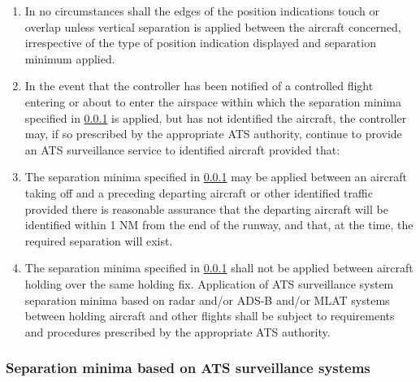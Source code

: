\begin{enumerate}
    \item In no circumstances shall the edges of the position indications touch or overlap unless vertical separation is applied between the aircraft concerned, irrespective of the type of position indication displayed and separation minimum applied.
    \item \label{8.7.2.8} In the event that the controller has been notified of a controlled flight entering or about to enter the airspace within which the separation minima specified in \ref{8.7.3} is applied, but has not identified the aircraft, the controller may, if so prescribed by the appropriate ATS authority, continue to provide an ATS surveillance service to identified aircraft provided that:
    

    \item \label{8.7.2.9} The separation minima specified in \ref{8.7.3} may be applied between an aircraft taking off and a preceding departing aircraft or other identified traffic provided there is reasonable assurance that the departing aircraft will be identified within 1 NM from the end of the runway, and that, at the time, the required separation will exist.
    \item The separation minima specified in \ref{8.7.3} shall not be applied between aircraft holding over the same holding fix. Application of ATS surveillance system separation minima based on radar and/or ADS-B and/or MLAT systems between holding aircraft and other flights shall be subject to requirements and procedures prescribed by the appropriate ATS authority.
\end{enumerate}

\subsubsection{Separation minima based on ATS surveillance systems} \label{8.7.3}

